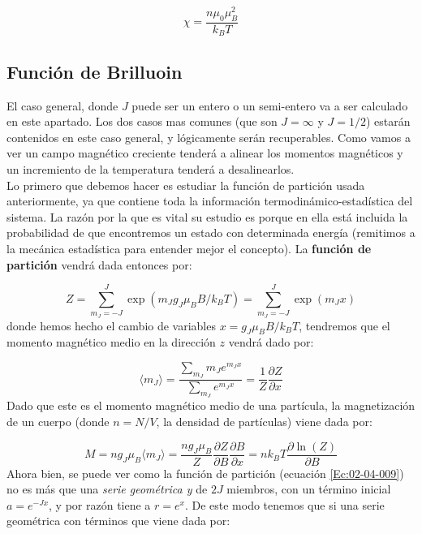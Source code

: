 \documentclass[12pt,a4paper]{book}
\numberwithin{equation}{section}
\numberwithin{figure}{section}
\newcommand{\parentesis}[1]{\left( #1  \right)}
\newcommand{\parciales}[2]{\frac{\partial #1}{\partial #2}}
\begin{document}
\begin{equation}
\chi = \frac{n \mu_0 \mu_B^2}{k_B T}
\end{equation}

\subsection{Función de Brilluoin}

El caso general, donde $J$ puede ser un entero o un semi-entero va a ser calculado en este apartado. Los dos casos mas comunes (que son $J = \infty$ y $J=1/2$) estarán contenidos en este caso general, y lógicamente serán recuperables. Como vamos a ver un campo magnético creciente tenderá a alinear los momentos magnéticos y un incremiento de la temperatura tenderá a desalinearlos. \\

Lo primero que debemos hacer es estudiar la función de partición usada anteriormente, ya que contiene toda la información termodinámico-estadística del sistema. La razón por la que es vital su estudio es porque en ella está incluida la probabilidad de que encontremos un estado con determinada energía (remitimos a la mecánica estadística para entender mejor el concepto). La \textbf{función de partición} vendrá dada entonces por:

\begin{equation}
Z = \sum_{m_J=-J}^{J} \exp \parentesis{m_J g_J \mu_B B / k_B T} = \sum_{m_J=-J}^{J} \exp \parentesis{m_J x}
\label{Ec:02-04-009}
\end{equation}
donde hemos hecho el cambio de variables $x=g_J \mu_B B / k_B T$, tendremos que el momento magnético medio en la dirección $z$ vendrá dado por:

\begin{equation}
\langle m_J \rangle = \frac{\sum_{m_J} m_J e^{m_J x}}{\sum_{m_J} e^{m_J x}} = \frac{1}{Z}  \parciales{Z}{x}
\end{equation}
Dado que este es el momento magnético medio de una partícula, la magnetización de un cuerpo (donde $n=N/V$, la densidad de partículas) viene dada por:

\begin{equation}
M = n g_J \mu_B \langle m_J \rangle = \frac{n g_J \mu_B}{Z} \parciales{Z}{B} \parciales{B}{x} = n k_B T \parciales{\ln (Z)}{B}
\end{equation} 
Ahora bien, se puede ver como la función de partición (ecuación \ref{Ec:02-04-009}) no es más que una \textit{serie geométrica y}  de $2J$ miembros, con un término inicial $a=e^{-Jx}$, y por razón tiene a $r = e^x$. De este modo tenemos que si una serie geométrica con términos que viene dada por:
\end{document}
